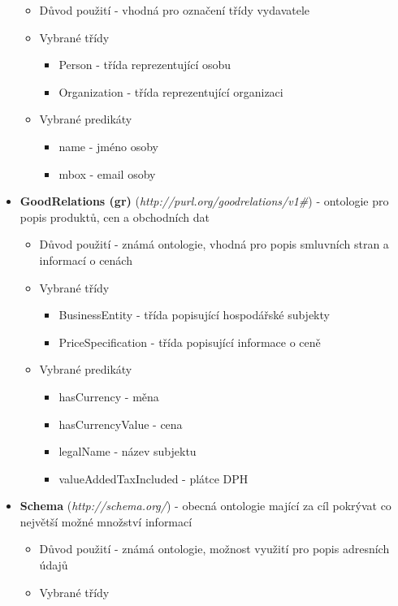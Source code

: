 \begin{itemize}
	\begin{itemize}
	\item Důvod použití - vhodná pro označení třídy vydavatele
	\item Vybrané třídy 
		\begin{itemize}
		\item Person - třída reprezentující osobu
		\item Organization - třída reprezentující organizaci 
		\end{itemize}
	\item Vybrané predikáty
		\begin{itemize}
		\item name - jméno osoby
		\item mbox - email osoby
		\end{itemize}
	\end{itemize}
\item \textbf{GoodRelations (gr)} (\textit{http://purl.org/goodrelations/v1\#})\cite{gr} - ontologie pro popis produktů, cen a obchodních dat
	\begin{itemize}
	\item Důvod použití - známá ontologie, vhodná pro popis smluvních stran a informací o cenách 
	\item Vybrané třídy 
		\begin{itemize}
		\item BusinessEntity - třída popisující hospodářské subjekty
		\item PriceSpecification - třída popisující informace o ceně
		\end{itemize}
	\item Vybrané predikáty
		\begin{itemize}
		\item hasCurrency - měna
		\item hasCurrencyValue - cena
		\item legalName - název subjektu
		\item valueAddedTaxIncluded - plátce DPH
		\end{itemize}
	\end{itemize}
\item \textbf{Schema} (\textit{http://schema.org/})\cite{schema} - obecná ontologie mající za cíl pokrývat co největší možné množství informací
	\begin{itemize}
	\item Důvod použití - známá ontologie, možnost využití pro popis adresních údajů 
	\item Vybrané třídy 
		\begin{itemize}

\end{itemize}
\end{itemize}
\end{itemize}
